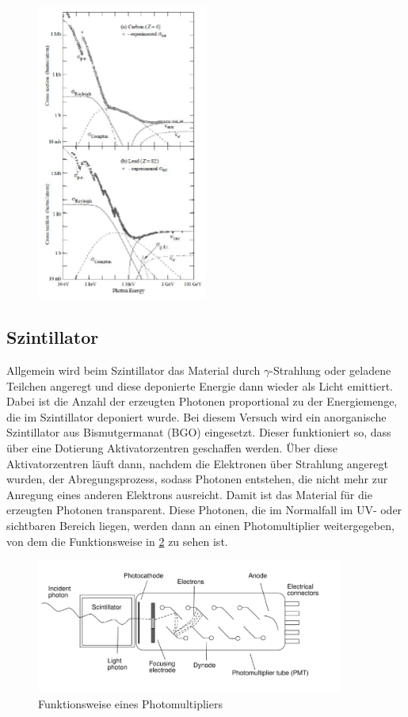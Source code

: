 \begin{figure}[h!]
	\centering
	\includegraphics[width=0.5\textwidth]{Wechselwirkung.png}
	\caption{}
	\label{Wechselwirkung}
\end{figure}

\subsection{Szintillator}
Allgemein wird beim Szintillator das Material durch $\gamma$-Strahlung oder geladene Teilchen angeregt und diese deponierte Energie dann wieder als Licht emittiert. Dabei ist die Anzahl der erzeugten Photonen proportional zu der Energiemenge, die im Szintillator deponiert wurde.
Bei diesem Versuch wird ein anorganische Szintillator aus Bismutgermanat (BGO) eingesetzt. Dieser funktioniert so, dass über eine Dotierung Aktivatorzentren geschaffen werden. Über diese Aktivatorzentren läuft dann, nachdem die Elektronen über Strahlung angeregt wurden, der Abregungsprozess, sodass Photonen entstehen, die nicht mehr zur Anregung eines anderen Elektrons ausreicht. Damit ist das Material für die erzeugten Photonen transparent. Diese Photonen, die im Normalfall im UV- oder sichtbaren Bereich liegen, werden dann an einen Photomultiplier weitergegeben, von dem die Funktionsweise in \cref{Photo} zu sehen ist. 

\begin{figure}[h!]
	\centering
	\includegraphics[width=0.9\textwidth]{Photo.png}
	\caption{Funktionsweise eines Photomultipliers}
	\label{Photo}
\end{figure}

